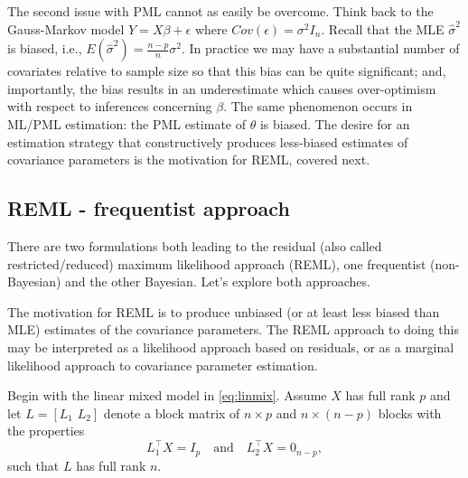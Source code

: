 \documentclass[
]{book}
\begin{document}
The second issue with PML cannot as easily be overcome. Think back to the Gauss-Markov model \(Y = X\beta+\epsilon\) where \(Cov(\epsilon) = \sigma^2 I_n\). Recall that the MLE \(\hat\sigma^2\) is biased, i.e., \(E(\hat\sigma^2) = \frac{n-p}{n}\sigma^2\). In practice we may have a substantial number of covariates relative to sample size so that this bias can be quite significant; and, importantly, the bias results in an underestimate which causes over-optimism with respect to inferences concerning \(\beta\). The same phenomenon occurs in ML/PML estimation: the PML estimate of \(\theta\) is biased. The desire for an estimation strategy that constructively produces less-biased estimates of covariance parameters is the motivation for REML, covered next.

\hypertarget{reml---frequentist-approach}{%
\subsection{REML - frequentist approach}\label{reml---frequentist-approach}}

There are two formulations both leading to the residual (also called restricted/reduced) maximum likelihood approach (REML), one frequentist (non-Bayesian) and the other Bayesian. Let's explore both approaches.

The motivation for REML is to produce unbiased (or at least less biased than MLE) estimates of the covariance parameters. The REML approach to doing this may be interpreted as a likelihood approach based on residuals, or as a marginal likelihood approach to covariance parameter estimation.

Begin with the linear mixed model in \eqref{eq:linmix}. Assume \(X\) has full rank \(p\) and let \(L = [L_1 \,\,L_2]\) denote a block matrix of \(n\times p\) and \(n\times (n-p)\) blocks with the properties
\[L_1^\top X = I_p \quad\text{and}\quad L_2^\top X = 0_{n-p},\]
such that \(L\) has full rank \(n\).
\end{document}
